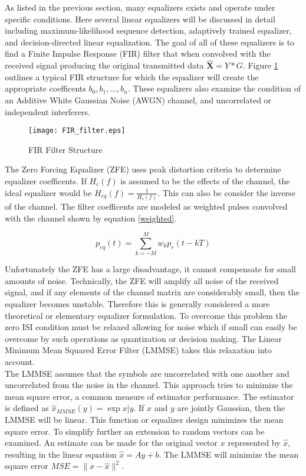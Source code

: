 As listed in the previous section, many equalizers exists and operate under specific conditions.  Here several linear equalizers will be discussed in detail including maximum-likelihood sequence detection, adaptively trained equalizer, and decision-directed linear equalization.  The goal of all of these equalizers is to find a Finite Impulse Response (FIR) filter that when convolved with the received signal producing the original transmitted data \( \boldsymbol{\hat{X}}=Y * G \).  Figure \ref{FIR_filter} outlines a typical FIR structure for which the equalizer will create the appropriate coefficents \(b_{0},b_{1},..., b_{n} \).  These equalizers also examine the condition of an Additive White Gaussian Noise (AWGN) channel, and uncorrelated or independent interferers.\\

\begin{figure}[!ht]\label{FIR_filter}
\centering
\texttt{[image: FIR\_filter.eps]}
\caption{FIR Filter Structure}
\end{figure}

The Zero Forcing Equalizer (ZFE) uses peak distortion criteria to determine equalizer coefficents.  If \(H_{c}(f)\) is assumed to be the effects of the channel, the ideal equalizer would be \( H_{eq}(f)=\frac{1}{H_{c}(f)}\).  This can also be consider the inverse of the channel.  The filter coefficents are modeled as weighted pulses convolved with the channel shown by equation \eqref{weighted}.

\begin{equation}\label{weighted}
p_{eq}(t) = \displaystyle\sum_{k=-M}^{M} w_{k}p_{r}(t-kT)
\end{equation}

Unfortunately the ZFE has a large disadvantage, it cannot compensate for small amounts of noise.  Technically, the ZFE will amplify all noise of the received signal, and if any elements of the channel matrix are considerably small, then the equalizer becomes unstable. Therefore this is generally considered a more theoretical or elementary equalizer formulation.  To overcome this problem the zero ISI condition must be relaxed allowing for noise which if small can easily be overcome by such operations as quantization or decision making.  The Linear Minimum Mean Squared Error Filter (LMMSE) takes this relaxation into account.\\ 

The LMMSE assumes that the symbols are uncorrelated with one another and uncorrelated from the noise in the channel.  This approach tries to minimize the mean square error, a common measure of estimator performance.  The estimator is defined as \(\hat{x}_{MMSE}(y)=\exp{x|y}\).  If \(x\) and \(y\) are jointly Gaussian, then the LMMSE will be linear.  This function or equalizer design minimizes the mean square error.  To simplify further an extension to random vectors can be examined.  An estimate can be made for the original vector \(x\) represented by \(\hat{x}\), resulting in the linear equation \(\hat{x}=Ay+b\).  The LMMSE will minimize the mean square error \(MSE = \|x-\hat{x}\|^{2}\).\\

